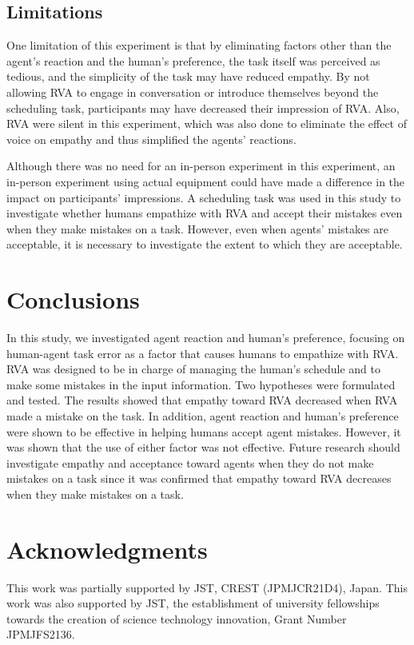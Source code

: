 \documentclass[runningheads]{llncs}
\begin{document}
\subsection{Limitations}
One limitation of this experiment is that by eliminating factors other than the agent's reaction and the human's preference, the task itself was perceived as tedious, and the simplicity of the task may have reduced empathy.
By not allowing RVA to engage in conversation or introduce themselves beyond the scheduling task, participants may have decreased their impression of RVA.
Also, RVA were silent in this experiment, which was also done to eliminate the effect of voice on empathy and thus simplified the agents' reactions.

Although there was no need for an in-person experiment in this experiment, an in-person experiment using actual equipment could have made a difference in the impact on participants' impressions.
A scheduling task was used in this study to investigate whether humans empathize with RVA and accept their mistakes even when they make mistakes on a task. 
However, even when agents' mistakes are acceptable, it is necessary to investigate the extent to which they are acceptable.


\section{Conclusions}
In this study, we investigated agent reaction and human's preference, focusing on human-agent task error as a factor that causes humans to empathize with RVA.
RVA was designed to be in charge of managing the human's schedule and to make some mistakes in the input information.
Two hypotheses were formulated and tested.
The results showed that empathy toward RVA decreased when RVA made a mistake on the task.
In addition, agent reaction and human's preference were shown to be effective in helping humans accept agent mistakes. 
However, it was shown that the use of either factor was not effective. 
Future research should investigate empathy and acceptance toward agents when they do not make mistakes on a task since it was confirmed that empathy toward RVA decreases when they make mistakes on a task.

\section*{Acknowledgments}
This work was partially supported by JST, CREST (JPMJCR21D4), Japan.
This work was also supported by JST, the establishment of university fellowships towards the creation of science technology innovation, Grant Number JPMJFS2136.


%
%
%


%
\end{document}
